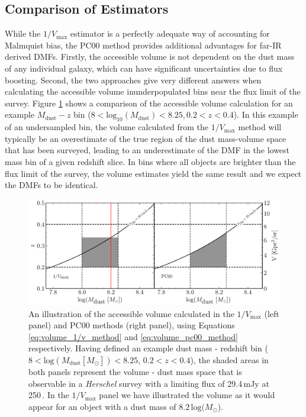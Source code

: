 \subsection{Comparison of Estimators}

While the $1/V_{\textrm{max}}$ estimator is a perfectly adequate way of accounting for Malmquist bias, the PC00 method provides additional advantages for far-IR derived DMFs. Firstly, the accessible volume is not dependent on the dust mass of any individual galaxy, which can have significant uncertainties due to flux boosting. Second, the two approaches give very different answers when calculating the accessible volume inunderpopulated bins near the flux limit of the survey. Figure \ref{fig:volume_comparison} shows a comparison of the accessible volume calculation for an example $M_{\textrm{dust}} - z$ bin ($8 < \textrm{log}_{10}(M_\textrm{dust}) < 8.25, 0.2 < z < 0.4$). In this example of an undersampled bin, the volume calculated from the $1/V_{\textrm{max}}$ method will typically be an overestimate of the true region of the dust mass-volume space that has been surveyed, leading to an underestimate of the DMF in the lowest mass bin of a given redshift slice. In bins where all objects are brighter than the flux limit of the survey, the volume estimates yield the same result and we expect the DMFs to be identical.

\begin{figure}
	\centering
	\includegraphics[width=\columnwidth]{Figures/volume_comparison.pdf}
	\caption[Example dust mass - redshift bin for the $1/V_{\textrm{max}}$ and PC00 methods]{An illustration of the accessible volume calculated in the $1/V_{\textrm{max}}$ (left panel) and PC00 methods (right panel), using Equations \ref{eq:volume_1/v_method} and \ref{eq:volume_pc00_method} respectively. Having defined an example dust mass - redshift bin ($8 < \textrm{log}(M_{\textrm{dust}} [M_{\odot}]) < 8.25$, $0.2 < z < 0.4$), the shaded areas in both panels represent the volume - dust mass space that is observable in a \textit{Herschel} survey with a limiting flux of 29.4\,mJy at 250\,\micron. In the $1/V_{\textrm{max}}$ panel we have illustrated the volume as it would appear for an object with a dust mass of $8.2\,\textrm{log}(M_{\odot}$).}
	\label{fig:volume_comparison}
\end{figure}

